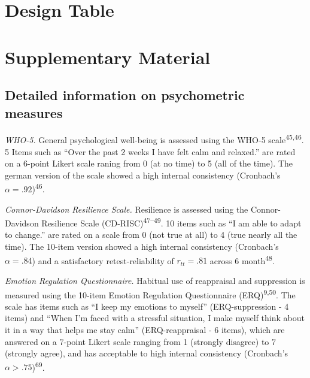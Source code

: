 \documentclass[
  man,floatsintext]{apa6}
\begin{document}
\hypertarget{DesignTable}{%
\section{Design Table}\label{DesignTable}}



\newpage

\hypertarget{SupplementaryMaterial}{%
\section{Supplementary Material}\label{SupplementaryMaterial}}


\setcounter{section}{19}
\setcounter{figure}{0}
\setcounter{table}{1}
\newpage

\hypertarget{SupplementQuestionnaires}{%
\subsection{Detailed information on psychometric measures}\label{SupplementQuestionnaires}}

\emph{WHO-5.} General psychological well-being is assessed using the WHO-5 scale\textsuperscript{45,46}.
5 Items such as ``Over the past 2 weeks I have felt calm and relaxed.'' are rated on a 6-point Likert scale raning from 0 (at no time) to 5 (all of the time).
The german version of the scale showed a high internal consistency (Cronbach's \(\alpha=.92\))\textsuperscript{46}.

\emph{Connor-Davidson Resilience Scale.} Resilience is assessed using the Connor-Davidson Resilience Scale (CD-RISC)\textsuperscript{47--49}.
10 items such as ``I am able to adapt to change.'' are rated on a scale from 0 (not true at all) to 4 (true nearly all the time).
The 10-item version showed a high internal consistency (Cronbach's \(\alpha=.84\)) and a satisfactory retest-reliability of \(r_{tt}=.81\) across 6 month\textsuperscript{48}.

\emph{Emotion Regulation Questionnaire.} Habitual use of reappraisal and suppression is measured using the 10-item Emotion Regulation Questionnaire (ERQ)\textsuperscript{9,50}.
The scale has items such as ``I keep my emotions to myself'' (ERQ-suppression - 4 items) and ``When I'm faced with a stressful situation, I make myself think about it in a way that helps me stay calm'' (ERQ-reappraisal - 6 items), which are answered on a 7-point Likert scale ranging from 1 (strongly disagree) to 7 (strongly agree), and has acceptable to high internal consistency (Cronbach's \(\alpha>.75\))\textsuperscript{69}.
\end{document}
